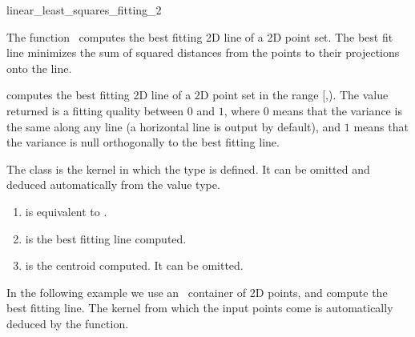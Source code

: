 
\begin{ccRefFunction}{linear_least_squares_fitting_2}  


\ccDefinition
  
The function \ccRefName\ computes the best fitting 2D line of a 2D
point set. The best fit line minimizes the sum of squared distances
from the points to their projections onto the line.


{ computes the best fitting 2D line of a 2D point set in the range
[,). The value returned is a fitting quality
between $0$ and $1$, where $0$ means that the variance is the same
along any line (a horizontal line is output by default), and $1$ means
that the variance is null orthogonally to the best fitting line. }

The class  is the kernel in which the type
 is defined. It can be omitted and
deduced automatically from the value type.


\begin{enumerate}
   \item  {} is equivalent to .
   \item  {} is the best fitting line computed.
   \item  {} is the centroid computed. 
          It can be omitted.
\end{enumerate}

\ccExample


In the following example we use an \stl\ container of 2D points, and
compute the best fitting line. The kernel from which the input points
come is automatically deduced by the function.


\end{ccRefFunction}
